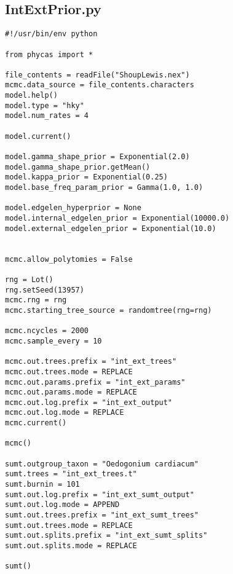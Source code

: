 \documentclass{article}
\begin{document}
\subsection{IntExtPrior.py}\label{IntExtPrior}
\begin{verbatim}
#!/usr/bin/env python

from phycas import *

file_contents = readFile("ShoupLewis.nex")
mcmc.data_source = file_contents.characters
model.help()
model.type = "hky"
model.num_rates = 4

model.current()

model.gamma_shape_prior = Exponential(2.0)
model.gamma_shape_prior.getMean()
model.kappa_prior = Exponential(0.25)
model.base_freq_param_prior = Gamma(1.0, 1.0)

model.edgelen_hyperprior = None
model.internal_edgelen_prior = Exponential(10000.0)
model.external_edgelen_prior = Exponential(10.0)


mcmc.allow_polytomies = False

rng = Lot()
rng.setSeed(13957)
mcmc.rng = rng
mcmc.starting_tree_source = randomtree(rng=rng)

mcmc.ncycles = 2000
mcmc.sample_every = 10

mcmc.out.trees.prefix = "int_ext_trees" 
mcmc.out.trees.mode = REPLACE 
mcmc.out.params.prefix = "int_ext_params" 
mcmc.out.params.mode = REPLACE 
mcmc.out.log.prefix = "int_ext_output" 
mcmc.out.log.mode = REPLACE 
mcmc.current()

mcmc()

sumt.outgroup_taxon = "Oedogonium cardiacum" 
sumt.trees = "int_ext_trees.t" 
sumt.burnin = 101 
sumt.out.log.prefix = "int_ext_sumt_output" 
sumt.out.log.mode = APPEND 
sumt.out.trees.prefix = "int_ext_sumt_trees" 
sumt.out.trees.mode = REPLACE 
sumt.out.splits.prefix = "int_ext_sumt_splits" 
sumt.out.splits.mode = REPLACE 

sumt()


\end{verbatim}


\newpage

\end{document}
